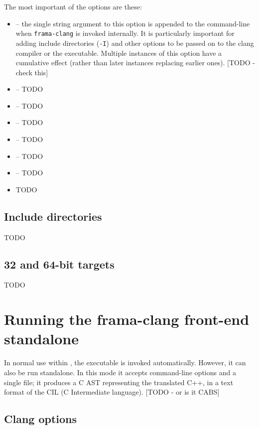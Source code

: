 The most important of the options are these:
\begin{itemize}
	\item {} -- the single string argument to this option is appended to the command-line when 
	\lstinline|frama-clang| is invoked internally. It is particularly 
	important for adding include directories (\lstinline|-I|) and
	other options to be passed on to the clang compiler or the \irg executable. 
	Multiple instances of this option have a cumulative effect (rather
	than later instances replacing earlier ones). [TODO - check this]
	\item {} -- TODO
	\item {} -- TODO
	\item {} -- TODO
	\item {} -- TODO
	\item {} -- TODO
	\item {} -- TODO
		\item TODO
\end{itemize}

\section{Include directories}

TODO

\section{32 and 64-bit targets}

TODO


\chapter{Running the frama-clang front-end standalone}

In normal use within \fc, the \irg executable is
invoked automatically. However, it can also be run standalone.
In this mode it accepts command-line options and a single file;
it produces a C AST representing the translated C++, in a text format 
of the CIL (C Intermediate language). [TODO - or is it CABS]

\section{Clang options}


